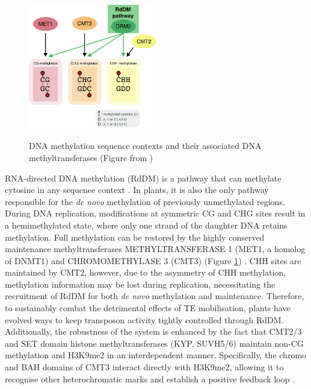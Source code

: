 \begin{figure}[htbp!] 
\centering    
    \includegraphics[width=0.5\textwidth]{Chapter1/Figs/base_mods.png}
\caption{DNA methylation sequence contexts and their associated DNA methyltransferases (Figure from \cite{RN61})}
\label{fig:meth_pathways}
\captionsetup{font=small}
    \caption*{}
\end{figure}

RNA-directed DNA methylation (RdDM) is a pathway that can methylate cytosine in any sequence context \cite{RN33}. In plants, it is also the only pathway responsible for the \textit{de novo} methylation of previously unmethylated regions. During DNA replication, modifications at symmetric CG and CHG sites result in a hemimethylated state, where only one strand of the daughter DNA retains methylation. Full methylation can be restored by the highly conserved maintenance methyltransferases METHYLTRANSFERASE 1 (MET1, a homolog of DNMT1) and CHROMOMETHYLASE 3 (CMT3) (Figure \ref{fig:meth_pathways}) \cite{RN61}. CHH sites are maintained by CMT2, however, due to the asymmetry of CHH methylation, methylation information may be lost during replication, necessitating the recruitment of RdDM for both \textit{de novo} methylation and maintenance. Therefore, to sustainably combat the detrimental effects of TE mobilisation, plants have evolved ways to keep transposon activity tightly controlled through RdDM. Additionally, the robustness of the system is enhanced by the fact that CMT2/3 and SET domain histone methyltransferases (KYP, SUVH5/6) maintain non-CG methylation and H3K9me2 in an interdependent manner. Specifically, the chromo and BAH domains of CMT3 interact directly with H3K9me2, allowing it to recognise other heterochromatic marks and establish a positive feedback loop \cite{RN33}.

